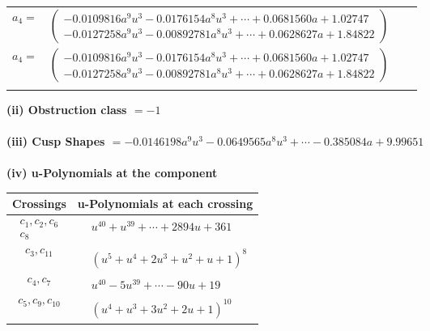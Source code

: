 \documentclass[1p]{elsarticle_modified}
\theoremstyle{definition}
\begin{document}
\begin{tabular}{m{7pt} m{180pt} m{7pt} m{180pt} }
\flushright $a_{4}=$&$\begin{pmatrix}-0.0109816 a^{9} u^{3}-0.0176154 a^{8} u^{3}+\cdots+0.0681560 a+1.02747\\-0.0127258 a^{9} u^{3}-0.00892781 a^{8} u^{3}+\cdots+0.0628627 a+1.84822\end{pmatrix}$\\ \flushright $a_{4}=$&$\begin{pmatrix}-0.0109816 a^{9} u^{3}-0.0176154 a^{8} u^{3}+\cdots+0.0681560 a+1.02747\\-0.0127258 a^{9} u^{3}-0.00892781 a^{8} u^{3}+\cdots+0.0628627 a+1.84822\end{pmatrix}$\\&\end{tabular}
\flushleft \textbf{(ii) Obstruction class $= -1$}\\~\\
\flushleft \textbf{(iii) Cusp Shapes $= -0.0146198 a^{9} u^{3}-0.0649565 a^{8} u^{3}+\cdots-0.385084 a+9.99651$}\\~\\
\newpage\renewcommand{\arraystretch}{1}
\flushleft \textbf{(iv) u-Polynomials at the component}\newline \\
\begin{tabular}{m{50pt}|m{274pt}}
Crossings & \hspace{64pt}u-Polynomials at each crossing \\
\hline $$\begin{aligned}c_{1},c_{2},c_{6}\\c_{8}\end{aligned}$$&$\begin{aligned}
&u^{40}+u^{39}+\cdots+2894 u+361
\end{aligned}$\\
\hline $$\begin{aligned}c_{3},c_{11}\end{aligned}$$&$\begin{aligned}
&(u^5+u^4+2 u^3+u^2+u+1)^8
\end{aligned}$\\
\hline $$\begin{aligned}c_{4},c_{7}\end{aligned}$$&$\begin{aligned}
&u^{40}-5 u^{39}+\cdots-90 u+19
\end{aligned}$\\
\hline $$\begin{aligned}c_{5},c_{9},c_{10}\end{aligned}$$&$\begin{aligned}
&(u^4+u^3+3 u^2+2 u+1)^{10}
\end{aligned}$\\
\hline
\end{tabular}\\~\\
\end{document}
